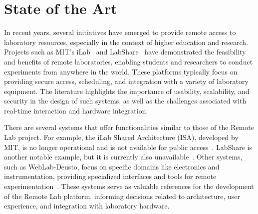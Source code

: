 %
%
\chapter{State of the Art} \label{cap:state-of-the-art}

In recent years, several initiatives have emerged to provide remote access to laboratory resources, especially in the context of higher education and research. Projects such as MIT's iLab~\cite{ilab} and LabShare~\cite{labshare} have demonstrated the feasibility and benefits of remote laboratories, enabling students and researchers to conduct experiments from anywhere in the world. These platforms typically focus on providing secure access, scheduling, and integration with a variety of laboratory equipment. The literature highlights the importance of usability, scalability, and security in the design of such systems, as well as the challenges associated with real-time interaction and hardware integration.

There are several systems that offer functionalities similar to those of the Remote Lab project. For example, the iLab Shared Architecture (ISA), developed by MIT, is no longer operational and is not available for public access~\cite{ilab}. LabShare is another notable example, but it is currently also unavailable~\cite{labshare}. Other systems, such as WebLab-Deusto, focus on specific domains like electronics and instrumentation, providing specialized interfaces and tools for remote experimentation~\cite{weblabdeusto}. These systems serve as valuable references for the development of the Remote Lab platform, informing decisions related to architecture, user experience, and integration with laboratory hardware.
